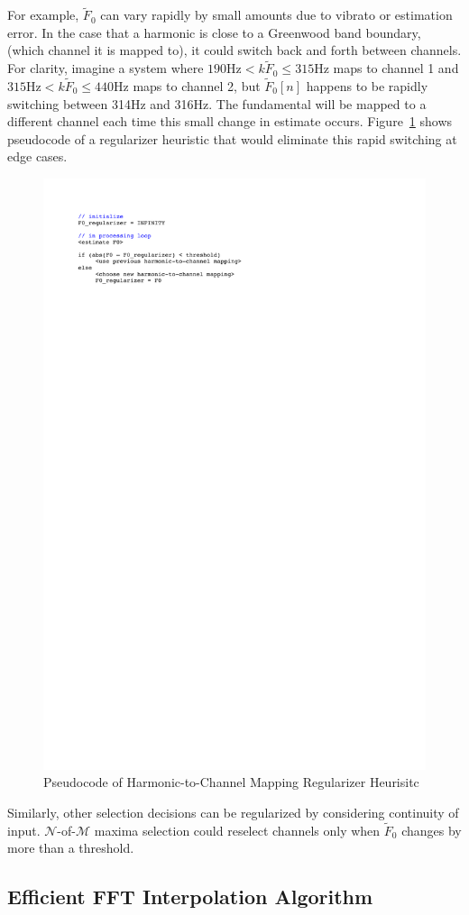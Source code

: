 \documentclass [11pt, proquest,oneside] {ganter_thesis}[2015/03/03]
\begin{document}
For example, $\tilde{F}_0$ can vary rapidly by small amounts due to vibrato or estimation error.  In the case that a harmonic is close to a Greenwood band boundary, (which channel it is mapped to), it could switch back and forth between channels.  For clarity, imagine a system where $190\mathrm{Hz} < k\tilde{F}_0 \leq 315\mathrm{Hz}$ maps to channel 1 and $315\mathrm{Hz} < k\tilde{F}_0 \leq 440\mathrm{Hz}$ maps to channel 2, but $\tilde{F}_0[n]$ happens to be rapidly switching between 314Hz and 316Hz.  The fundamental will be mapped to a different channel each time this small change in estimate occurs.  Figure~\ref{fig:heuristic_pseudocode} shows pseudocode of a regularizer heuristic that would eliminate this rapid switching at edge cases.

\begin{figure}[!ht]
  \centering
    \includegraphics[width=.6\textwidth]{pseudocode}
    \caption{Pseudocode of Harmonic-to-Channel Mapping Regularizer Heurisitc}\label{fig:heuristic_pseudocode}
\end{figure}

Similarly, other selection decisions can be regularized by considering continuity of input.  $\mathcal{N}$-of-$\mathcal{M}$ maxima selection could reselect channels only when $\tilde{F}_0$ changes by more than a threshold.

\subsection{Efficient FFT Interpolation Algorithm}
\end{document}
